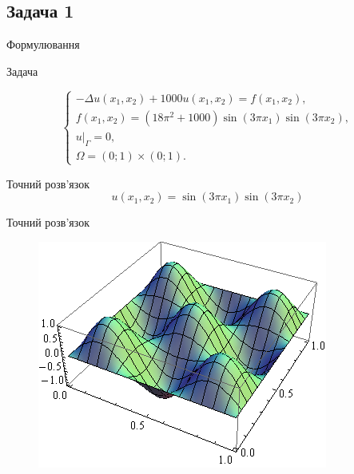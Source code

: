 
\subsection{Задача 1}
\frame{\subsectionpage}
\begin{frame}{Формулювання}

		Задача

		\begin{equation}\label{eq:problem1}
		\begin{cases}
			- \Delta u(x_1,x_2) + 1000u(x_1, x_2) = f(x_1,x_2), \\
			f(x_1,x_2) = (18 \pi^2 +1000)\sin(3 \pi x_1) \sin (3 \pi x_2), \\
			u|_\Gamma = 0 ,\\
			\Omega = \left(0;1\right) \times \left(0;1\right).
		\end{cases}
		\end{equation}

		Точний розв'язок
		\begin{equation}
			u(x_1,x_2) = \sin(3 \pi x_1) \sin (3 \pi x_2)
		\end{equation}

\end{frame}

\begin{frame}{Точний розв'язок}
		\begin{figure}[H]
			\centering
		    \includegraphics[scale=0.6]{problem1/ExactSolution}
		    \label{plot:problem1_exact}
		\end{figure}
\end{frame}

